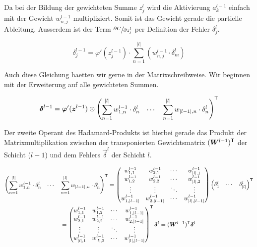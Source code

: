 Da bei der Bildung der gewichteten Summe $z_j^l$ wird die Aktivierung
$a_k^{l-1}$ einfach mit der Gewicht $w_{n,j}^{l-1}$ multipliziert. Somit ist das
Gewicht gerade die partielle Ableitung. Ausserdem ist der Term
$\sfrac{\partial C}{\partial z_j^l}$ per Definition der Fehler $\delta_j^l$.

\begin{equation}\tag{BP2}
  \delta_j^{l-1} = \varphi'(z_j^{l-1}) \cdot \sum_{n=1}^{|l|} \left( w_{n,j}^{l-1} \cdot \delta_m^l \right)
\end{equation}

Auch diese Gleichung haetten wir gerne in der Matrixschreibweise. Wir beginnen
mit der Erweiterung auf alle gewichteten Summen.

\begin{equation*}
  \bm{\delta}^{l-1} = \bm{\varphi}'(\bm{z}^{l-1}) \odot \begin{pmatrix} \displaystyle\sum_{n=1}^{|l|} w_{1,n}^{l-1} \cdot \delta_n^l & \cdots & \displaystyle\sum_{n=1}^{|l|} w_{|l-1|,n} \cdot \delta_n^l \end{pmatrix}^{\mathsf{T}}
\end{equation*}

Der zweite Operant des Hadamard-Produkts ist hierbei gerade das Produkt der
Matrixmultiplikation zwischen
der transponierten Gewichtsmatrix $(\bm{W}^{l-1})^{\mathsf{T}}$ der Schicht ($l-1$)
und dem Fehlers $\vec{\delta}^l$ der Schicht $l$.

\begin{gather*}
  \begin{pmatrix} \displaystyle\sum_{n=1}^{|l|} w_{1,n}^{l-1} \cdot \delta_n^l & \cdots & \displaystyle\sum_{n=1}^{|l|} w_{|l-1|,n} \cdot \delta_n^l \end{pmatrix}^{\mathsf{T}} =
  \begin{pmatrix}
    w_{1,1}^{l-1} & w_{2,1}^{l-1} & \cdots & w_{|l|,1}^{l-1} \\
    w_{1,2}^{l-1} & w_{2,2}^{l-1} & \cdots & w_{|l|,2}^{l-1} \\
    \vdots & \vdots & \ddots & \vdots \\
    w_{1,|l-1|}^{l-1} & w_{2,|l-1|}^{l-1} & \cdots & w_{|l|,|l-1|}^{l-1}
  \end{pmatrix}
  \begin{pmatrix} \delta_1^l & \cdots & \delta_{|l|}^l \end{pmatrix}^{\mathsf{T}} \\=
  \begin{pmatrix}
    w_{1,1}^{l-1} & w_{1,2}^{l-1} & \cdots & w_{1,|l-1|}^{l-1} \\
    w_{2,1}^{l-1} & w_{2,2}^{l-1} & \cdots & w_{2,|l-1|}^{l-1} \\
    \vdots & \vdots & \ddots & \vdots \\
    w_{|l|,1}^{l-1} & w_{|l|,2}^{l-1} & \cdots & w_{|l|,|l-1|}^{l-1}
  \end{pmatrix}^{\mathsf{T}}
  \bm{\delta}^l = (\bm{W}^{l-1})^{\mathsf{T}} \bm{\delta}^l
\end{gather*}

